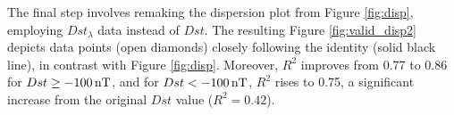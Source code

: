 \documentclass[a4paper,fleqn]{cas-dc}
\begin{document}
The final step involves remaking the dispersion plot from Figure \ref{fig:disp}, employing $Dst_\lambda$ data instead of $Dst$. The resulting Figure \ref{fig:valid_disp2} depicts data points (open diamonds) closely following the identity (solid black line), in contrast with Figure \ref{fig:disp}. Moreover, $R^2$ improves from 0.77 to 0.86 for $Dst \ge -100\, {\rm nT}$, and for $Dst < -100\, {\rm nT}$, $R^2$ rises to 0.75, a significant increase from the original $Dst$ value ($R^2=0.42$).

\end{document}
